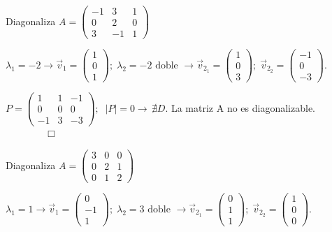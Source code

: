 	
\begin{miejercicio}
	Diagonaliza $A=\left(\begin{matrix} -1&3&1\\0&2&0\\3&-1&1  \end{matrix}\right)$
\end{miejercicio}



\noindent \small{$ \lambda_1=-2 \longrightarrow \vec v_1=\left( \begin{matrix} 1\\0\\1 \end{matrix}\right); \; \lambda_2=-2 \text { doble } \longrightarrow \vec v_{2_1}=\left( \begin{matrix} 1\\0\\3 \end{matrix}\right); \;\vec v_{2_2}=\left( \begin{matrix} -1\\0\\-3 \end{matrix}\right)$}\normalsize{.}

$P=\left(\begin{matrix} 1&1&-1\\0&0&0\\-1&3&-3  \end{matrix}\right);\; \; |P|=0 \longrightarrow \, \nexists D$. La matriz A no es diagonalizable.$\qquad \qquad \Box$
	


\begin{miejercicio}
	Diagonaliza $A=\left(\begin{matrix} 3&0&0\\0&2&1\\0&1&2  \end{matrix}\right)$
\end{miejercicio}



\noindent \small{$ \lambda_1=1 \longrightarrow \vec v_1=\left( \begin{matrix} 0\\-1\\1 \end{matrix}\right); \; \lambda_2=3 \text { doble } \longrightarrow \vec v_{2_1}=\left( \begin{matrix} 0\\1\\1 \end{matrix}\right); \;\vec v_{2_2}=\left( \begin{matrix} 1\\0\\0 \end{matrix}\right)$}\normalsize{.}

